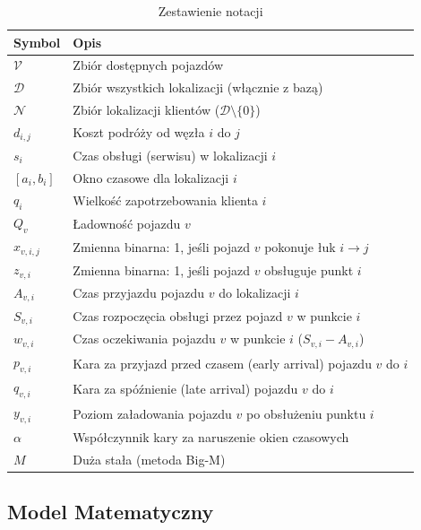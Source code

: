 \begin{table}[ht]
	\renewcommand{\arraystretch}{1.2}
    \scriptsize
	\caption{Zestawienie notacji}
	\label{tab:notation}
	\centering
	\begin{tabularx}{\textwidth}{lL}
		\toprule
		Symbol & Opis  \\
		\midrule
		$\mathcal{V}$ & Zbiór dostępnych pojazdów \\ 
        $\mathcal{D}$ & Zbiór wszystkich lokalizacji (włącznie z bazą) \\
        $\mathcal{N}$ & Zbiór lokalizacji klientów ($\mathcal{D}\setminus\{0\}$) \\
        $d_{i,j}$ & Koszt podróży od węzła $i$ do $j$ \\
        $s_i$ & Czas obsługi (serwisu) w lokalizacji $i$ \\
        $[a_i,b_i]$ & Okno czasowe dla lokalizacji $i$\\
        $q_i$ & Wielkość zapotrzebowania klienta $i$\\
        $Q_v$ & Ładowność pojazdu $v$ \\
        $x_{v,i,j}$ & Zmienna binarna: 1, jeśli pojazd $v$ pokonuje łuk $i\rightarrow j$ \\
        $z_{v,i}$ & Zmienna binarna: 1, jeśli pojazd $v$ obsługuje punkt $i$\\
        $A_{v,i}$ & Czas przyjazdu pojazdu $v$ do lokalizacji $i$\\
        $S_{v,i}$ & Czas rozpoczęcia obsługi przez pojazd $v$ w punkcie $i$\\
        $w_{v,i}$ & Czas oczekiwania pojazdu $v$ w punkcie $i$ ($S_{v,i}-A_{v,i}$)\\
        $p_{v,i}$ & Kara za przyjazd przed czasem (early arrival) pojazdu $v$ do $i$ \\ 
        $q_{v,i}$ & Kara za spóźnienie (late arrival) pojazdu $v$ do $i$ \\
        $y_{v,i}$ & Poziom załadowania pojazdu $v$ po obsłużeniu punktu $i$\\
        $\alpha$ & Współczynnik kary za naruszenie okien czasowych\\
        $M$ & Duża stała (metoda Big-M)\\
        \bottomrule
	\end{tabularx}
\end{table}

\subsection{Model Matematyczny}

